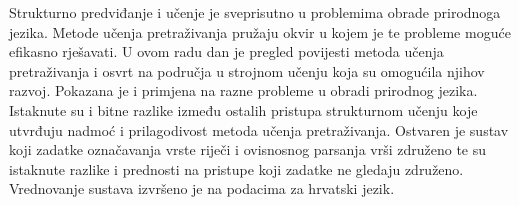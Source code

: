 \begin{sazetak}
Strukturno predviđanje i učenje je sveprisutno u problemima obrade prirodnoga
jezika. Metode učenja pretraživanja pružaju okvir u kojem je te probleme moguće
efikasno rješavati. U ovom radu dan je pregled povijesti metoda učenja
pretraživanja i osvrt na područja u strojnom učenju koja su omogućila njihov
razvoj. Pokazana je i primjena na razne probleme u obradi prirodnog jezika.
Istaknute su i bitne razlike između ostalih pristupa strukturnom učenju koje
utvrđuju nadmoć i prilagodivost metoda učenja pretraživanja. Ostvaren je
sustav koji zadatke označavanja vrste riječi i ovisnosnog parsanja vrši
združeno te su istaknute razlike i prednosti na pristupe koji zadatke ne gledaju
združeno. Vrednovanje sustava izvršeno je na podacima za hrvatski jezik.

\end{sazetak}
